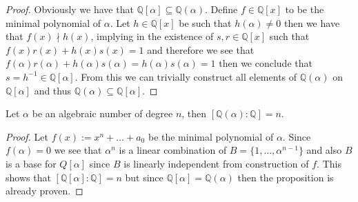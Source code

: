 \begin{proof}
   Obviously we have that \(\mathbb{Q}[\alpha] \subseteq \mathbb{Q}(\alpha)\).
   Define \(f \in \mathbb{Q}[x]\) to be the minimal polynomial of \(\alpha\).
   Let \(h \in \mathbb{Q}[x]\) be such that \(h(\alpha) \neq 0\) then
   we have that \(f(x) \nmid h(x)\), implying in the existence of \(s, r \in
   \mathbb{Q}[x]\) such that \(f(x)r(x) + h(x)s(x) = 1\) and therefore we see
   that \(f(\alpha)r(\alpha) + h(\alpha)s(\alpha) = h(\alpha)s(\alpha) = 1\)
   then we conclude that \(s = h^{-1} \in \mathbb{Q}[\alpha]\). From this we can
   trivially construct all elements of \(\mathbb{Q}(\alpha)\) on
   \(\mathbb{Q}[\alpha]\) and thus \(\mathbb{Q}(\alpha) \subseteq
   \mathbb{Q}[\alpha]\).
\end{proof}

\begin{corollary}
   Let \(\alpha\) be an algebraic number of degree \(n\), then
   \([\mathbb{Q}(\alpha) : \mathbb{Q}] = n\).
\end{corollary}

\begin{proof}
   Let \(f(x) := x^n + \dots + a_0\) be the minimal polynomial of
   \(\alpha\). Since \(f(\alpha) = 0\) we see that \(\alpha^n\) is a linear
   combination of \(B = \{1,\dots,\alpha^{n-1}\}\) and also \(B\) is a base for
   \(Q[\alpha]\) since \(B\) is linearly independent from construction of \(f\). 
   This shows that \([\mathbb{Q}[\alpha] : \mathbb{Q}] = n\) but since
   \(\mathbb{Q}[\alpha] = \mathbb{Q}(\alpha)\) then the proposition is already
   proven.
\end{proof}


